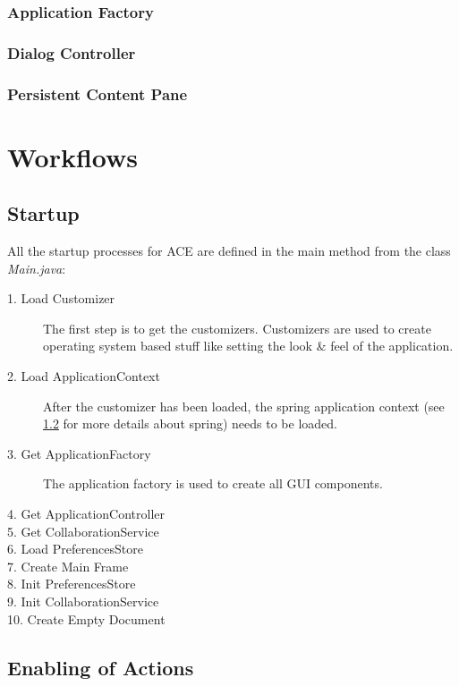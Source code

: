 \subsubsection{Application Factory}
\subsubsection{Dialog Controller}
\subsubsection{Persistent Content Pane}



\newpage
\section{Workflows}

\subsection{Startup}
All the startup processes for ACE are defined in the main method from the class \textit{Main.java}:
\begin{description}
\item[1. Load Customizer ] The first step is to get the customizers. Customizers are used to create operating system based stuff like setting the look \& feel of the application.
\item[2. Load ApplicationContext ] After the customizer has been loaded, the spring application context (see \ref{} for more details about spring) needs to be loaded.
\item[3. Get ApplicationFactory ] The application factory is used to create all GUI components.
\item[4. Get ApplicationController ]  
\item[5. Get CollaborationService ] 
\item[6. Load PreferencesStore ]
\item[7. Create Main Frame ]
\item[8. Init PreferencesStore ]
\item[9. Init CollaborationService ]
\item[10. Create Empty Document ]
\end{description}




\subsection{Enabling of Actions}


